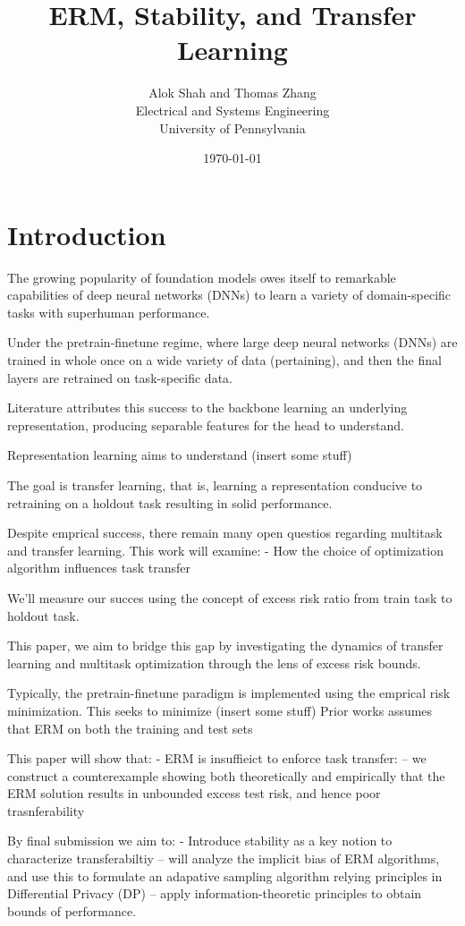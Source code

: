 \documentclass[a4paper, 12pt]{article}
\title{\textbf{ERM, Stability, and Transfer Learning}}
\author{Alok Shah and Thomas Zhang \\ Electrical and Systems Engineering \\ University of Pennsylvania}
\date{\today}
\begin{document}
\maketitle

\section*{Introduction}

The growing popularity of foundation models owes itself to
remarkable capabilities of deep neural networks (DNNs) to learn a variety of domain-specific tasks with superhuman performance. 

Under the pretrain-finetune regime, where large deep neural networks (DNNs) are trained in whole once on a wide variety of data (pertaining), and then the final layers are retrained on task-specific data.

Literature attributes this success to the backbone learning an underlying representation, producing separable features for the head to understand.

Representation learning aims to understand (insert some stuff)

The goal is transfer learning, that is, learning a representation conducive to retraining on a holdout task resulting in solid performance.


Despite emprical success, there remain many open questios regarding multitask and transfer learning.
This work will examine:
- How the choice of optimization algorithm influences task transfer

We'll measure our succes using the concept of excess risk ratio from train task to holdout task. 


This paper, we aim to bridge this gap by investigating the dynamics of transfer learning and multitask optimization through the lens of excess risk bounds.

Typically, the pretrain-finetune paradigm is implemented using the emprical risk minimization. 
This seeks to minimize (insert some stuff)
Prior works assumes that ERM on both the training and test sets 


This paper will show that:
- ERM is insuffieict to enforce task transfer:
-- we construct a counterexample showing both theoretically and empirically that the ERM solution results in unbounded excess test risk, and hence poor trasnferability


By final submission we aim to:
- Introduce stability as a key notion to characterize transferabiltiy
-- will analyze the implicit bias of ERM algorithms, and use this to formulate 
an adapative sampling algorithm relying principles in Differential Privacy (DP)
-- apply information-theoretic principles to obtain bounds of performance.
\end{document}
